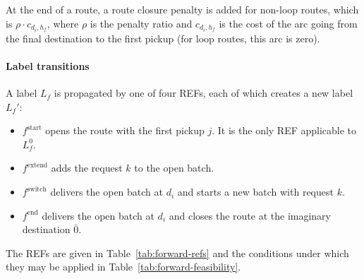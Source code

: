 \documentclass[preprint,11pt,authoryear]{elsarticle}
\begin{document}
At the end of a route, a route closure penalty is added for non-loop routes, which is $\rho \cdot c_{d_i,h_f}$, where 
$\rho$ is the penalty ratio and $c_{d_i,h_f}$ is the cost of the arc going from the final destination to the first pickup (for loop routes, this arc is zero).

\paragraph{Label transitions}
A label $L_f$ is propagated by one of four REFs, each of which creates a new label $L_f'$:
\begin{itemize}
  \item $f^{\mathrm{start}}$ opens the route with the first pickup $j$. It is the only REF applicable to $L_f^0$.
  \item $f^{\mathrm{extend}}$ adds the request $k$ to the open batch.
  \item $f^{\mathrm{switch}}$ delivers the open batch at $d_i$ and starts a new batch with request $k$.
  \item $f^{\mathrm{end}}$ delivers the open batch at $d_i$ and closes the route at the imaginary destination $\bar 0$.
\end{itemize}
The REFs are given in Table~\ref{tab:forward-refs} and the conditions under which they 
may be applied in Table~\ref{tab:forward-feasibility}.


\newpage
\end{document}

